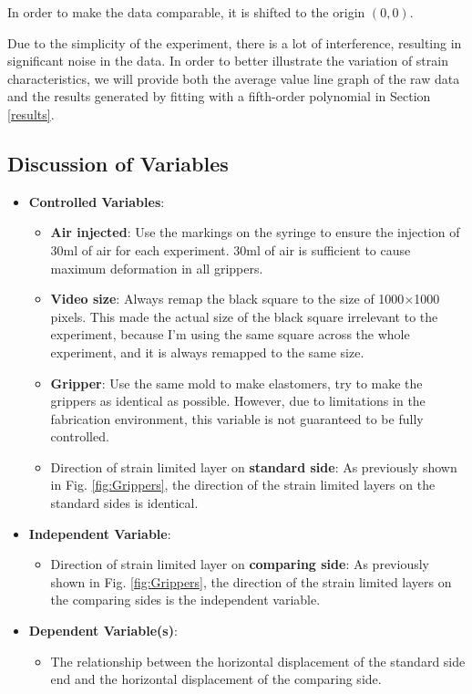 \documentclass[conference]{IEEEtran}
\begin{document}
In order to make the data comparable, it is shifted to the origin $(0,0)$.

Due to the simplicity of the experiment, there is a lot of interference, resulting in significant noise in the data. In order to better illustrate the variation of strain characteristics, we will provide both the average value line graph of the raw data and the results generated by fitting with a fifth-order polynomial in Section \ref{results}.


\subsection{Discussion of Variables}

\begin{itemize}
    \item \textbf{Controlled Variables}: %
    \begin{itemize}
        \item \textbf{Air injected}: Use the markings on the syringe to ensure the injection of 30ml of air for each experiment. 30ml of air is sufficient to cause maximum deformation in all grippers.
        \item \textbf{Video size}: Always remap the black square to the size of 1000$\times$1000 pixels. This made the actual size of the black square irrelevant to the experiment, because I'm using the same square across the whole experiment, and it is always remapped to the same size.
        \item \textbf{Gripper}: Use the same mold to make elastomers, try to make the grippers as identical as possible. However, due to limitations in the fabrication environment, this variable is not guaranteed to be fully controlled.
        \item Direction of strain limited layer on \textbf{standard side}:  As previously shown in Fig. \ref{fig:Grippers}, the direction of the strain limited layers on the standard sides is identical.
    \end{itemize}

    \item \textbf{Independent Variable}: 
        \begin{itemize}
            \item Direction of strain limited layer on \textbf{comparing side}: As previously shown in Fig. \ref{fig:Grippers}, the direction of the strain limited layers on the comparing sides is the independent variable. 
        \end{itemize}
    \item \textbf{Dependent Variable(s)}: 
         \begin{itemize}
             \item The relationship between the horizontal displacement of the standard side end and the horizontal displacement of the comparing side.
         \end{itemize}
\end{itemize}
\end{document}
